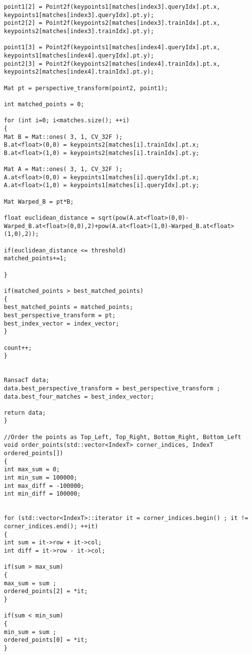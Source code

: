 \begin{lstlisting}
point1[2] = Point2f(keypoints1[matches[index3].queryIdx].pt.x, keypoints1[matches[index3].queryIdx].pt.y);
point2[2] = Point2f(keypoints2[matches[index3].trainIdx].pt.x, keypoints2[matches[index3].trainIdx].pt.y);

point1[3] = Point2f(keypoints1[matches[index4].queryIdx].pt.x, keypoints1[matches[index4].queryIdx].pt.y);
point2[3] = Point2f(keypoints2[matches[index4].trainIdx].pt.x, keypoints2[matches[index4].trainIdx].pt.y);

Mat pt = perspective_transform(point2, point1);

int matched_points = 0;

for (int i=0; i<matches.size(); ++i)
{
Mat B = Mat::ones( 3, 1, CV_32F );
B.at<float>(0,0) = keypoints2[matches[i].trainIdx].pt.x;
B.at<float>(1,0) = keypoints2[matches[i].trainIdx].pt.y;

Mat A = Mat::ones( 3, 1, CV_32F );
A.at<float>(0,0) = keypoints1[matches[i].queryIdx].pt.x;
A.at<float>(1,0) = keypoints1[matches[i].queryIdx].pt.y;

Mat Warped_B = pt*B;

float euclidean_distance = sqrt(pow(A.at<float>(0,0)-Warped_B.at<float>(0,0),2)+pow(A.at<float>(1,0)-Warped_B.at<float>(1,0),2));

if(euclidean_distance <= threshold)
matched_points+=1;

}

if(matched_points > best_matched_points)
{
best_matched_points = matched_points;
best_perspective_transform = pt;
best_index_vector = index_vector;
}

count++;
}


RansacT data;
data.best_perspective_transform = best_perspective_transform ;
data.best_four_matches = best_index_vector;

return data;
}

//Order the points as Top_Left, Top_Right, Bottom_Right, Bottom_Left
void order_points(std::vector<IndexT> corner_indices, IndexT ordered_points[])
{
int max_sum = 0;
int min_sum = 100000;
int max_diff = -100000;
int min_diff = 100000;


for (std::vector<IndexT>::iterator it = corner_indices.begin() ; it != corner_indices.end(); ++it)
{
int sum = it->row + it->col;
int diff = it->row - it->col;

if(sum > max_sum)
{
max_sum = sum ;
ordered_points[2] = *it;
}

if(sum < min_sum)
{
min_sum = sum ;
ordered_points[0] = *it;	
}


\end{lstlisting}
